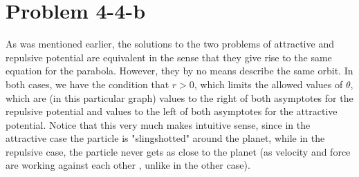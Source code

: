 \section*{Problem 4-4-b}
As was mentioned earlier, the solutions to the two problems of attractive and repulsive potential are equivalent in the sense that they give rise to the same equation for the parabola. However, they by no means describe the same orbit. In both cases, we have the condition that $r>0$, which limits the allowed values of $\theta$, which are (in this particular graph) values to the right of both asymptotes for the repulsive potential and values to the left of both asymptotes for the attractive potential. Notice that this very much makes intuitive sense, since in the attractive case the particle is "slingshotted" around the planet, while in the repulsive case, the particle never gets as close to the planet (as velocity and force are working against each other , unlike in the other case). 
